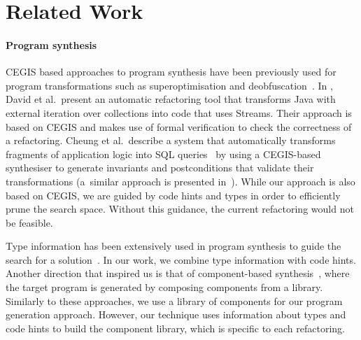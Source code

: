 \documentclass[sigconf,review,anonymous]{acmart}
\begin{document}
  
\section{Related Work}

\paragraph{Program synthesis}


CEGIS based approaches to program synthesis have been previously used
for program transformations such as superoptimisation and
deobfuscation~\cite{DBLP:conf/icse/JhaGST10}.  In
\cite{DBLP:journals/corr/abs-1712-07388}, David et al.~present an
automatic refactoring tool that transforms Java with external
iteration over collections into code that uses Streams. Their approach
is based on CEGIS and makes use of formal verification to check the
correctness of a refactoring.  Cheung et al.~describe a system that
automatically transforms fragments of application logic into SQL
queries~\cite{DBLP:conf/pldi/CheungSM13} by using a CEGIS-based
synthesiser to generate invariants and postconditions that validate
their transformations (a~similar approach is presented
in~\cite{DBLP:conf/cc/IuCZ10}).  While our approach is also based
on CEGIS, we are guided by code hints and types in
order to efficiently prune the search space. Without this guidance,
the current refactoring would not be feasible.  

Type information has been extensively used in program synthesis to
guide the search for a solution~\cite{DBLP:conf/sfp/Katayama05,DBLP:conf/pldi/FeserCD15,DBLP:conf/pldi/OseraZ15,DBLP:journals/pacmpl/LubinCOC20}.
In our work, we combine type information with code hints.
%
Another direction that inspired us is that of component-based synthesis~\cite{DBLP:conf/icse/JhaGST10,DBLP:conf/pldi/GulwaniJTV11,DBLP:conf/popl/FengM0DR17}, where the target program is generated by composing components from a library. Similarly
to these approaches, we use a library of components for our program
generation approach. However, our technique uses information about types
and code hints to build the component library, which is specific to each refactoring.

\end{document}
